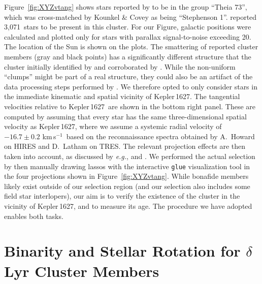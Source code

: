 \documentclass[12pt,modern,twocolumn,tighten]{aastex63}
\newcommand{\sn}{Kepler\,1627} %
\newcommand{\noriginal}{3{,}071} %
\newcommand{\kms}{\,km\,s$^{-1}$}
\begin{document}
Figure~\ref{fig:XYZvtang} shows stars reported by
\citet{kounkel_untangling_2019} to be in the group ``Theia 73'', which
was cross-matched by Kounkel \& Covey as being ``Stephenson 1''.
\citet{kounkel_untangling_2019} reported \noriginal\ stars to be
present in this cluster.  For our Figure, galactic positions were
calculated and plotted only for stars with parallax signal-to-noise
exceeding 20.  The location of the Sun is shown on the plots.  The
smattering of reported cluster members (gray and black points) has a
significantly different structure that the cluster initially
identified by \citet{stephenson_possible_1959} and corroborated by
\citet{eggen_photometric_1968}.  While the non-uniform ``clumps''
might be part of a real structure, they could also be an artifact of
the data processing steps performed by
\citet{kounkel_untangling_2019}.  We therefore opted to only consider
stars in the immediate kinematic and spatial vicinity of \sn.  The
tangential velocities relative to \sn\ are shown in the bottom right
panel.  These are computed by assuming that every star has the same
three-dimensional spatial velocity as \sn, where we assume a systemic
radial velocity of $-16.7 \pm 0.2$\,\kms\ based on the reconnaissance
spectra obtained by A.~Howard on HIRES and D.~Latham on TRES.  The
relevant projection effects are then taken into account, as discussed
by {\it e.g.}, \citet{Meingast2021} and \citet{bouma_2021_ngc2516}.
We performed the actual selection by then manually drawing lassos with
the interactive \texttt{glue} visualization tool
\citep{beaumont_2014_13866} in the four projections shown in
Figure~\ref{fig:XYZvtang}.  While bonafide members likely exist
outside of our selection region (and our selection also includes some
field star interlopers), our aim is to verify the existence of the
cluster in the vicinity of Kepler\,1627, and to measure its age.  The
procedure we have adopted enables both tasks.


\section{Binarity and Stellar Rotation for $\delta$\,Lyr Cluster Members}
\label{app:rotationbinarity}
\end{document}
